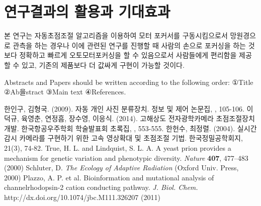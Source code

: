 \documentclass{abstract_hutech}
\begin{document}
\section{연구결과의 활용과 기대효과}

본 연구는 자동초점조절 알고리즘을 이용하여 모터 포커서를 구동시킴으로서 망원경으로 관측을 하는 경우나 이에 관련된 연구를 진행할 때 사람의 손으로 포커싱을 하는 것보다 정확하고 빠르게 오토모터포커싱을 할 수 있음으로서 사람들에게 편리함을 제공할 수 있고, 기존의 제품보다 더 값싸게 구현이 가능할 것이다.

Abstracts and Papers should be written according to the following order: ①Title ②Ab을stract ③Main text ④References.

\begin{thebibliography}{99}
 한인구, 김형국. (2009). 자동 개인 사진 분류장치. 정보 및 제어 논문집, , 105-106.
 이덕규, 육영춘, 연정흠, 장수영, 이응식. (2014). 고해상도 전자광학카메라 초점조절장치 개발. 한국항공우주학회 학술발표회 초록집, , 553-555.
 한헌수, 최정렬. (2004). 실시간 감시 카메라를 구현하기 위한 고속 영상확대 및 초점조절 기법. 한국정밀공학회지, 21(3), 74-82.
\bibitem
{} True, H. L. and Lindquist, S. L. A. A yeast prion provides a mechanism for genetic variation and phenotypic diversity. {\it Nature} {\bf 407}, 477--483 (2000)
 Schluter, D. {\it The Ecology of Adaptive Radiation} (Oxford Univ. Press, 2000)
 Plazzo, A. P. et al. Bioinformation and mutational analysis of channelrhodopsin-2 cation conducting pathway. {\it J. Biol. Chem.} http://dx.doi.org/10.1074/jbc.M111.326207 (2011)
\end{thebibliography}
\end{document}
